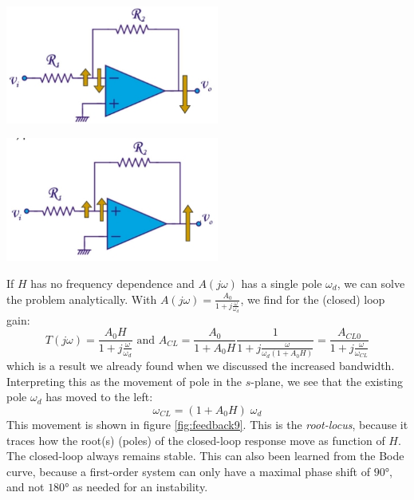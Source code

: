 \begin{minipage}{.5\textwidth}
	\centering
	\includegraphics[width=7cm]{figures/ch10/feedback7.jpg}
	\label{fig:feedback7}
\end{minipage}%
\begin{minipage}{.5\textwidth}
	\centering
	\includegraphics[width=7cm]{figures/ch10/feedback8.jpg}
	\label{fig:feedback8}
\end{minipage}

If $H$ has no frequency dependence and $A(j\omega)$ has a single pole $\omega_d$, we can solve the problem analytically. With $A(j\omega) = \frac{A_0}{1 + j\frac{\omega}{\omega_d}}$, we find for the (closed) loop gain:
$$
T(j\omega) = \frac{A_0 H}{1 + j\frac{\omega}{\omega_d}} \text{ and } A_{CL} = \frac{A_0}{1 + A_0H} \frac{1}{1 + j \frac{\omega}{\omega_d(1 + A_0 H)}} = \frac{A_{CL0}}{1 + j\frac{\omega}{\omega_{CL}}}
$$
which is a result we already found when we discussed the increased bandwidth. Interpreting this as the movement of pole in the $s$-plane, we see that the existing pole $\omega_d$ has moved to the left: 
$$\omega_{CL} = (1 + A_0H) \; \omega_d$$
This movement is shown in figure \ref{fig:feedback9}. This is the \emph{root-locus}, because it traces how the root(s) (poles) of the closed-loop response move as function of $H$. The closed-loop always remains stable. This can also been learned from the Bode curve, because a first-order system can only have a maximal phase shift of $90$°, and not $180$° as needed for an instability.

